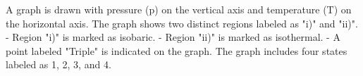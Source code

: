 A graph is drawn with pressure (p) on the vertical axis and temperature (T) on the horizontal axis. The graph shows two distinct regions labeled as "i)" and "ii)".  
- Region "i)" is marked as isobaric.  
- Region "ii)" is marked as isothermal.  
- A point labeled "Triple" is indicated on the graph.  
The graph includes four states labeled as 1, 2, 3, and 4.